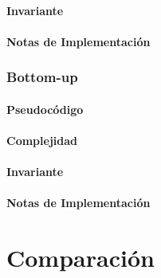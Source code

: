 \documentclass[]{article}
\numberwithin{equation}{section}
\numberwithin{figure}{section}
\theoremstyle{definition}
\begin{document}
	\subsection*{Invariante}
	
	\subsection*{Notas de Implementación}

\section*{Bottom-up}

	\subsection*{Pseudocódigo}
	
	\subsection*{Complejidad}
	
	\subsection*{Invariante}
	
	\subsection*{Notas de Implementación}

\part*{Comparación}
\end{document}
